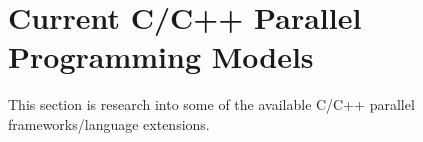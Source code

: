 \section{Current C/C++ Parallel Programming Models}

This section is research into some of the available C/C++ parallel frameworks/language extensions.




